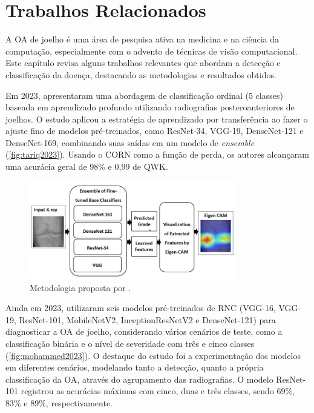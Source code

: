 \chapter{Trabalhos Relacionados}\label{cap:trab_relacionados}

A OA de joelho é uma área de pesquisa ativa na medicina e na ciência da computação, especialmente com o advento de técnicas de visão computacional. Este capítulo revisa alguns trabalhos relevantes que abordam a detecção e classificação da doença, destacando as metodologias e resultados obtidos.

Em 2023,  apresentaram uma abordagem de classificação ordinal (5 classes) baseada em aprendizado profundo utilizando radiografias posteroanteriores de joelhos. O estudo aplicou a estratégia de aprendizado por transferência ao fazer o ajuste fino de modelos pré-treinados, como ResNet-34, VGG-19, DenseNet-121 e DenseNet-169, combinando suas saídas em um modelo de \textit{ensemble} (\autoref{fig:tariq2023}). Usando o CORN como a função de perda, os autores alcançaram uma acurácia geral de 98\% e 0,99 de QWK.

\begin{figure}[!htbp]
    \centering
    \includegraphics[width=0.8\textwidth]{figs/tariq2023.png}
    \caption{Metodologia proposta por .}
    \label{fig:tariq2023}
\end{figure}

Ainda em 2023,  utilizaram seis modelos pré-treinados de RNC (VGG-16, VGG-19, ResNet-101, MobileNetV2, InceptionResNetV2 e DenseNet-121) para diagnosticar a OA de joelho, considerando vários cenários de teste, como a classificação binária e o nível de severidade com três e cinco classes (\autoref{fig:mohammed2023}). O destaque do estudo foi a experimentação dos modelos em diferentes cenários, modelando tanto a detecção, quanto a própria classificação da OA, através do agrupamento das radiografias. O modelo ResNet-101 registrou as acurácias máximas com cinco, duas e três classes, sendo 69\%, 83\% e 89\%, respectivamente.

